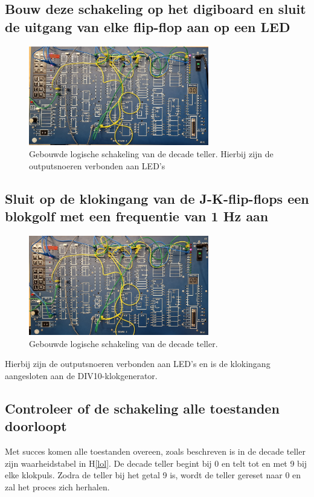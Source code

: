 \documentclass[12pt]{article}
\begin{document}
\subsection{Bouw deze schakeling op het digiboard en sluit de uitgang van elke flip-flop aan op een LED} 
\begin{figure}[h]
    \centering
    \includegraphics[width=0.7\textwidth]{9LED.jpg}
    \caption{Gebouwde logische schakeling van de decade teller. Hierbij zijn de outputsnoeren verbonden aan LED's }
    \label{fig:9mod}
\end{figure}
\subsection{Sluit op de klokingang van de J-K-flip-flops een blokgolf met een frequentie van 1 Hz aan}
\begin{figure}[h]
    \centering
    \includegraphics[width=0.7\textwidth]{9LEDCLK.jpg}
    \caption{Gebouwde logische schakeling van de decade teller.}
    \label{fig:9mod}
\end{figure}
Hierbij zijn de outputsnoeren verbonden aan LED's en is de klokingang aangesloten aan de DIV10-klokgenerator.
\pagebreak
\subsection{Controleer of de schakeling alle toestanden doorloopt}
Met succes komen alle toestanden overeen, zoals beschreven is in de decade teller zijn waarheidstabel in H\ref{lol}.
De decade teller begint bij 0 en telt tot en met 9 bij elke klokpuls. 
Zodra de teller bij het getal 9 is, wordt de teller gereset naar 0 en zal het proces zich herhalen. 
\end{document}
